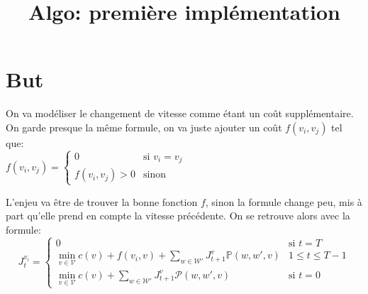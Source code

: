 \documentclass[10pt,a4paper]{article}
\title{Algo: première implémentation}
\newcommand{\W}{\mathcal{W}}
\newcommand{\V}{\mathcal{V}}
\begin{document}
\maketitle

\section{But}
On va modéliser le changement de vitesse comme étant un coût
supplémentaire. On garde presque la même formule, on va juste ajouter
un coût $f(v_i,v_j)$ tel que:\\
$f(v_i,v_j)=
\begin{cases}
  0 & \text{si } v_i=v_j \\
  f(v_i,v_j)>0 & \text{sinon}
\end{cases}
$

L'enjeu va être de trouver la bonne fonction $f$, sinon la formule
change peu, mis à part qu'elle prend en compte la vitesse
précédente. On se retrouve alors avec la formule:
\begin{equation}
  J_t^{v_i} =
  \begin{cases}
    0 & \text{si } t=T\\
    \min_{v\in\V}
    c(v)+f(v_i,v)+\sum_{w\in\W'}J_{t+1}^v\mathbb{P}(w,w',v) & 1\leq
    t\leq T-1\\
        \min_{v\in\V}
    c(v)+\sum_{w\in\W'}J_{t+1}^v\mathcal{P}(w,w',v) & \text{si }t=0

  \end{cases}
\end{equation}
\end{document}
